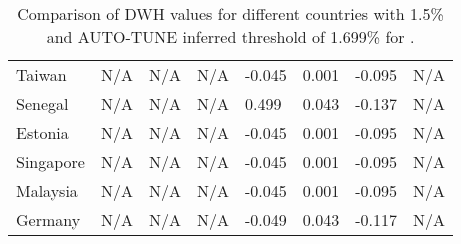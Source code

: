 \documentclass[utf8]{FrontiersinHarvard} %
\begin{document}
\begin{table}[h!]
\begin{tabularx}{\textwidth}{|l|X|X|X|X|X|X|X|}
Taiwan & N/A & N/A & N/A & -0.045 & 0.001 & -0.095 & N/A\\
Senegal & N/A & N/A & N/A & 0.499 & 0.043 & -0.137 & N/A\\
Estonia & N/A & N/A & N/A & -0.045 & 0.001 & -0.095 & N/A\\
Singapore & N/A & N/A & N/A & -0.045 & 0.001 & -0.095 & N/A \\
Malaysia & N/A & N/A & N/A & -0.045 & 0.001 & -0.095 & N/A \\
Germany & N/A & N/A & N/A & -0.049 & 0.043 & -0.117 & N/A \\
\hline
\end{tabularx}
  \caption{Comparison of DWH values for different countries with 1.5\% and AUTO-TUNE inferred threshold of 1.699\% for \cite{rhee_national_2019}.}
\label{tab:DWH_comparison}
\end{table}
\end{document}
